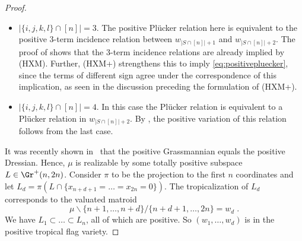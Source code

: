 \begin{proof}
\begin{itemize}
		\item $|\{i,j,k,l\}\cap[n]| = 3$. The positive Pl\"ucker relation here is equivalent to the positive 3-term incidence relation between $w_{|S\cap[n]|+1}$ and $w_{|S\cap[n]|+2}$.
		The proof of  shows that the 3-term incidence relations are already implied by (HXM). %
		Further, (HXM+) strengthens this to imply \eqref{eq:positivepluecker}, since the terms of different sign agree under the correspondence of this implication, as seen in the discussion preceding the formulation of (HXM+).
		\item $|\{i,j,k,l\}\cap[n]| = 4$. In this case the Pl\"ucker relation is equivalent to a Pl\"ucker relation in $w_{|S\cap[n]|+2}$.
		By , the positive variation of this relation follows from the last case. 
	\end{itemize}

        It was recently shown in~\cite{SpeyerWilliams:2021,ArkaniHamedLamSpradlin:2021} that the positive Grassmannian equals the positive Dressian.
        Hence, $\mu$ is realizable by some totally positive subspace $L\in \Gr^+(n,2n)$. Consider $\pi$ to be the projection to the first $n$ coordinates and let $L_d= \pi(L\cap \{x_{n+d+1}=\dots = x_{2n} = 0\})$. The tropicalization of $L_d$ corresponds to the valuated matroid 
	\[
	\mu\backslash \{n+1,\dots, n+d\} / \{n+d+1,\dots, 2n\} = w_d \;.
	\]
	We have $L_1\subset \dots \subset L_n$, all of which are positive.
        So $(w_1,\dots,w_d)$ is in the positive tropical flag variety.					
\end{proof}

